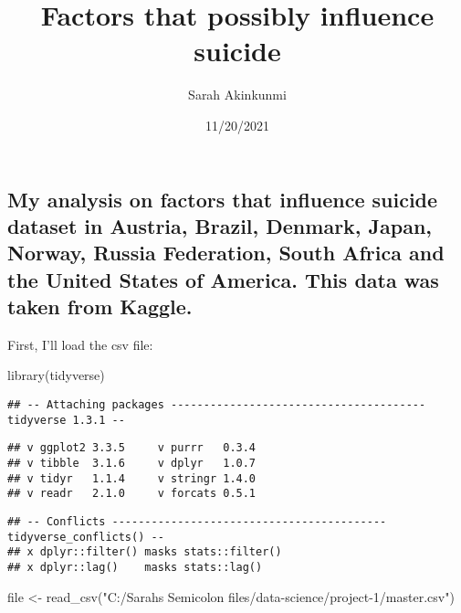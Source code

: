 \documentclass[
]{article}
\title{Factors that possibly influence suicide}
\author{Sarah Akinkunmi}
\date{11/20/2021}
\newenvironment{Shaded}{\begin{snugshade}}{\end{snugshade}}
\newcommand{\FunctionTok}[1]{\textcolor[rgb]{0.00,0.00,0.00}{#1}}
\newcommand{\NormalTok}[1]{#1}
\newcommand{\OtherTok}[1]{\textcolor[rgb]{0.56,0.35,0.01}{#1}}
\newcommand{\StringTok}[1]{\textcolor[rgb]{0.31,0.60,0.02}{#1}}
\begin{document}
\maketitle

\hypertarget{my-analysis-on-factors-that-influence-suicide-dataset-in-austria-brazil-denmark-japan-norway-russia-federation-south-africa-and-the-united-states-of-america.-this-data-was-taken-from-kaggle.}{%
\subsection{My analysis on factors that influence suicide dataset in
Austria, Brazil, Denmark, Japan, Norway, Russia Federation, South Africa
and the United States of America. This data was taken from
Kaggle.}\label{my-analysis-on-factors-that-influence-suicide-dataset-in-austria-brazil-denmark-japan-norway-russia-federation-south-africa-and-the-united-states-of-america.-this-data-was-taken-from-kaggle.}}

First, I'll load the csv file:

\begin{Shaded}
\begin{Highlighting}[]
\FunctionTok{library}\NormalTok{(tidyverse)}
\end{Highlighting}
\end{Shaded}

\begin{verbatim}
## -- Attaching packages --------------------------------------- tidyverse 1.3.1 --
\end{verbatim}

\begin{verbatim}
## v ggplot2 3.3.5     v purrr   0.3.4
## v tibble  3.1.6     v dplyr   1.0.7
## v tidyr   1.1.4     v stringr 1.4.0
## v readr   2.1.0     v forcats 0.5.1
\end{verbatim}

\begin{verbatim}
## -- Conflicts ------------------------------------------ tidyverse_conflicts() --
## x dplyr::filter() masks stats::filter()
## x dplyr::lag()    masks stats::lag()
\end{verbatim}

\begin{Shaded}
\begin{Highlighting}[]
\NormalTok{file }\OtherTok{\textless{}{-}} \FunctionTok{read\_csv}\NormalTok{(}\StringTok{"C:/Sarah\textquotesingle{}s Semicolon files/data{-}science/project{-}1/master.csv"}\NormalTok{)}
\end{Highlighting}
\end{Shaded}
\end{document}
